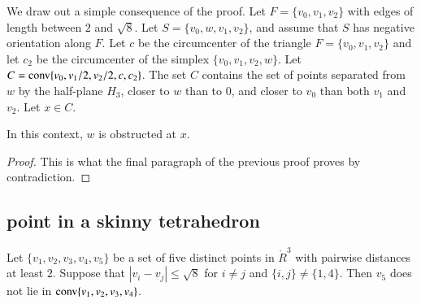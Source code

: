 We draw out a simple consequence of the proof.
Let
$F=\{v_0,v_1,v_2\}$ with edges of length between $2$ and $\sqrt8$.
Let $S=\{v_0,w,v_1,v_2\}$, and assume that $S$ has negative
orientation along $F$. Let $c$ be the circumcenter of the triangle
$F=\{v_0,v_1,v_2\}$ and let $c_2$ be the circumcenter of the simplex
$\{v_0,v_1,v_2,w\}$. Let
$C={\operatorname{conv}}\{v_0,v_1/2,v_2/2,c,c_2\}$.  The set $C$ contains the set of points
separated from $w$ by the half-plane $H_3$, closer to $w$ than to
$0$, and closer to $v_0$ than both $v_1$ and $v_2$. Let $x\in C$.


\begin{lemma}
In this context, $w$ is obstructed at $x$.
\end{lemma}

\begin{proof} This is what the final paragraph of the previous proof proves by contradiction.
\end{proof}



\newpage
\subsection{point in a skinny tetrahedron}



\begin{lemma} 
Let 
$\{v_1,v_2,v_3,v_4,v_5\}$ be a set of 
five distinct points in $\ring{R}^3$
with pairwise distances at least $2$.  Suppose that $|v_i-v_j|\le
\sqrt8$ for $i\ne j$ and $\{i,j\}\ne\{1,4\}$. Then $v_5$ does not lie
in ${\operatorname{conv}}\{v_1,v_2,v_3,v_4\}$.
\end{lemma}


